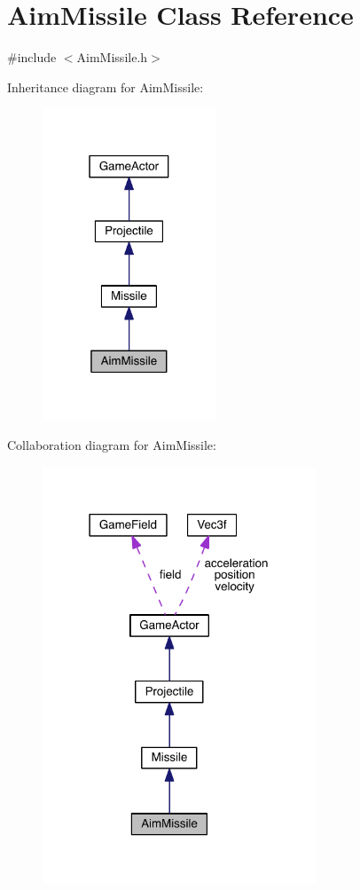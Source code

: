 \hypertarget{class_aim_missile}{\section{Aim\+Missile Class Reference}
\label{class_aim_missile}
}


{\ttfamily \#include $<$Aim\+Missile.\+h$>$}



Inheritance diagram for Aim\+Missile\+:\nopagebreak
\begin{figure}[H]
\begin{center}
\leavevmode
\includegraphics[width=147pt]{class_aim_missile__inherit__graph}
\end{center}
\end{figure}


Collaboration diagram for Aim\+Missile\+:\nopagebreak
\begin{figure}[H]
\begin{center}
\leavevmode
\includegraphics[width=231pt]{class_aim_missile__coll__graph}
\end{center}
\end{figure}
